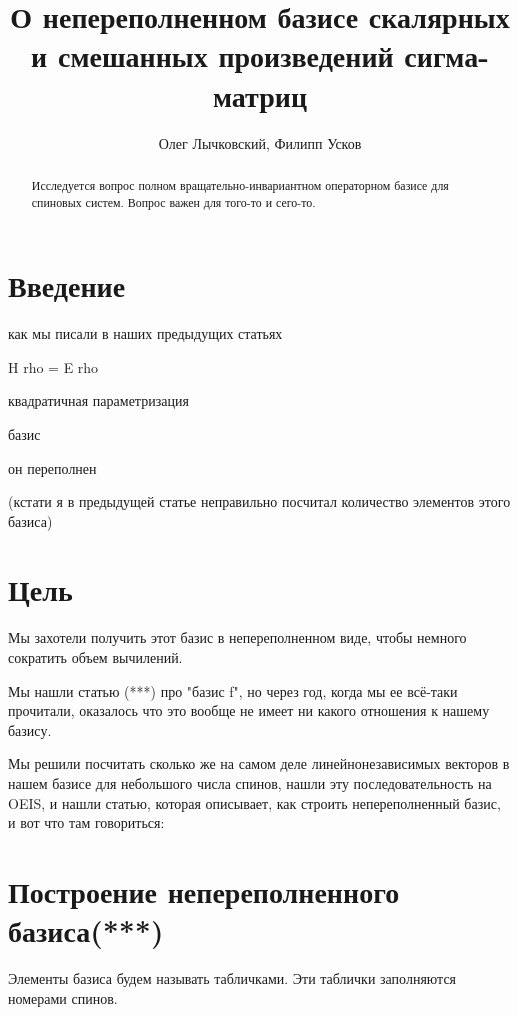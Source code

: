 \documentclass[]{article}
\title{О непереполненном базисе скалярных и смешанных произведений сигма-матриц}
\author{Олег Лычковский, Филипп Усков}
\begin{document}
\maketitle

\begin{abstract}
Исследуется вопрос полном вращательно-инвариантном операторном базисе для спиновых систем.  Вопрос важен для того-то и сего-то.

\end{abstract}

\section{Введение}
как мы писали в наших предыдущих статьях

H rho = E rho

квадратичная параметризация

базис

он переполнен

(кстати я в предыдущей статье неправильно посчитал количество элементов этого базиса)

\section{Цель}
Мы захотели получить этот базис в непереполненном виде, чтобы немного сократить объем вычилений.

Мы нашли статью (***) про "базис f", но через год, когда мы ее всё-таки прочитали, оказалось что это вообще не имеет ни какого отношения к нашему базису.

Мы решили посчитать сколько же на самом деле линейнонезависимых векторов в нашем базисе для небольшого числа спинов,
нашли эту последовательность на OEIS, 
и нашли статью, которая описывает, как строить непереполненный базис, и вот что там говориться:

\section{Построение непереполненного базиса(***)}
Элементы базиса будем называть табличками. Эти таблички заполняются номерами спинов.
\end{document}

